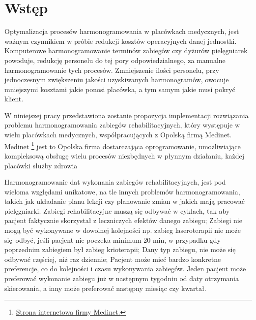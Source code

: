  \section*{Wstęp}
 Optymalizacja procesów harmonogramowania w placówkach medycznych, jest
	ważnym czynnikiem w próbie redukcji kosztów operacyjnych danej
	jednostki. Komputerowe harmonogramowanie terminów zabiegów czy dyżurów
	pielęgniarek powoduje, redukcję personelu do tej pory odpowiedzialnego,
	za manualne harmonogramowanie tych procesów. Zmniejszenie ilości
	personelu, przy jednoczesnym zwiększeniu jakości uzyskiwanych
	harmonogramów, owocuje mniejszymi kosztami jakie ponosi placówka, a tym
	samym jakie musi pokryć klient.

W niniejszej pracy przedstawiona zostanie propozycja implementacji rozwiązania
problemu harmonogramowania zabiegów rehabilitacyjnych, który występuje w wielu
placówkach medycznych, współpracujących z Opolską firmą Medinet. Medinet
\footnote{\href{http://www.medinet.opole.pl/}{Strona internetowa firmy Medinet.}} jest to
Opolska firma dostarczająca oprogramowanie, umożliwiające kompleksową obsługę
wielu procesów niezbędnych w płynnym działaniu, każdej placówki służby zdrowia

Harmonogramowanie dat wykonania zabiegów rehabilitacyjnych, jest pod wieloma
względami unikatowe, na tle innych problemów harmonogramowania, takich jak
układanie planu lekcji czy planowanie zmian w jakich mają pracować pielęgniarki.
Zabiegi rehabilitacyjne muszą się odbywać w cyklach, tak aby pacjent faktycznie
skorzystał z leczniczych efektów danego zabiegu; Zabiegi nie mogą być wykonywane
w dowolnej kolejności np. zabieg laseroterapii nie może się odbyć, jeśli pacjent
nie poczeka minimum 20 min, w przypadku gdy poprzednim zabiegiem był zabieg
krioterapii; Dany typ zabiegu, nie może się odbywać częściej, niż raz dziennie;
Pacjent może mieć bardzo konkretne preferencje, co do kolejności i czasu
wykonywania zabiegów. Jeden pacjent może preferować wykonanie zabiegu już w
następnym tygodniu od daty otrzymania skierowania, a inny może preferować
następny miesiąc czy kwartał.
